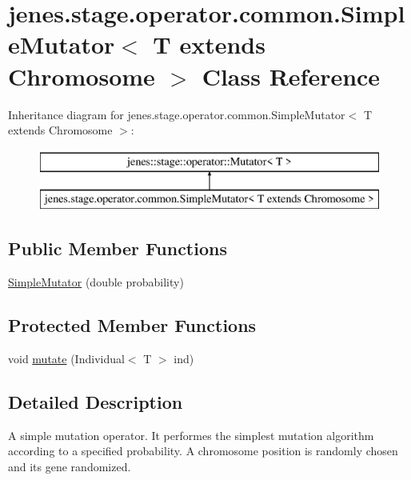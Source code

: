 \hypertarget{classjenes_1_1stage_1_1operator_1_1common_1_1_simple_mutator_3_01_t_01extends_01_chromosome_01_4}{\section{jenes.\-stage.\-operator.\-common.\-Simple\-Mutator$<$ T extends Chromosome $>$ Class Reference}
\label{classjenes_1_1stage_1_1operator_1_1common_1_1_simple_mutator_3_01_t_01extends_01_chromosome_01_4}
}
Inheritance diagram for jenes.\-stage.\-operator.\-common.\-Simple\-Mutator$<$ T extends Chromosome $>$\-:\begin{figure}[H]
\begin{center}
\leavevmode
\includegraphics[height=2.000000cm]{classjenes_1_1stage_1_1operator_1_1common_1_1_simple_mutator_3_01_t_01extends_01_chromosome_01_4}
\end{center}
\end{figure}
\subsection*{Public Member Functions}
\begin{DoxyCompactItemize}
\item 
\hyperlink{classjenes_1_1stage_1_1operator_1_1common_1_1_simple_mutator_3_01_t_01extends_01_chromosome_01_4_a5872d2360575c78f7b010aaee5ba5b30}{Simple\-Mutator} (double probability)
\end{DoxyCompactItemize}
\subsection*{Protected Member Functions}
\begin{DoxyCompactItemize}
\item 
void \hyperlink{classjenes_1_1stage_1_1operator_1_1common_1_1_simple_mutator_3_01_t_01extends_01_chromosome_01_4_af54219113222ec25ff39116d3925cc4d}{mutate} (Individual$<$ T $>$ ind)
\end{DoxyCompactItemize}


\subsection{Detailed Description}
A simple mutation operator. It performes the simplest mutation algorithm according to a specified probability. A chromosome position is randomly chosen and its gene randomized. 


